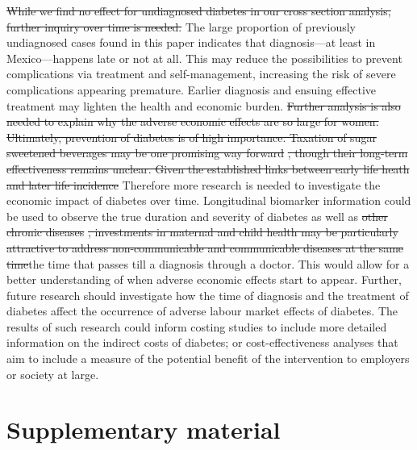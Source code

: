 \documentclass[12pt,english]{article}
\providecommand{\DIFaddtex}[1]{{\protect\color{blue}#1}} %
\providecommand{\DIFdeltex}[1]{{\protect\color{red}\sout{#1}}}                      %
\providecommand{\DIFaddbegin}{} %
\providecommand{\DIFaddend}{} %
\providecommand{\DIFdelbegin}{} %
\providecommand{\DIFdelend}{} %
\providecommand{\DIFadd}[1]{\texorpdfstring{\DIFaddtex{#1}}{#1}} %
\providecommand{\DIFdel}[1]{\texorpdfstring{\DIFdeltex{#1}}{}} %
\begin{document}
\DIFdelbegin \DIFdel{While we find no effect for undiagnosed diabetes in our cross section analysis, further inquiry over time is needed. }\DIFdelend The large proportion of previously undiagnosed cases \DIFaddbegin \DIFadd{found in this paper }\DIFaddend indicates that diagnosis—at least in Mexico—happens late or not at all. This may reduce the possibilities to prevent complications via treatment and self-management, increasing the risk of severe complications appearing premature. Earlier diagnosis and ensuing effective treatment may lighten the health and economic burden. \DIFdelbegin \DIFdel{Further analysis is also needed to explain why the adverse economic effects are so large for women. Ultimately, prevention of diabetes is of high importance. Taxation of sugar sweetened beverages may be one promising way forward }%
\DIFdel{, though their long-term effectiveness remains unclear. Given the established links between early life heath and later life incidence }\DIFdelend \DIFaddbegin \DIFadd{Therefore more research is needed to investigate the economic impact of diabetes over time. Longitudinal biomarker information could be used to observe the true duration and severity }\DIFaddend of diabetes as well as \DIFdelbegin \DIFdel{other chronic diseases }%
\DIFdel{, investments in maternal and child health may be particularly attractive to address non-communicable and communicable diseases at the same time}\DIFdelend \DIFaddbegin \DIFadd{the time that passes till a diagnosis through a doctor. This would allow for a better understanding of when adverse economic effects start to appear. Further, future research should investigate how the time of diagnosis and the treatment of diabetes affect the occurrence of adverse labour market effects of diabetes. The results of such research could inform costing studies to include more detailed information on the indirect costs of diabetes; or cost-effectiveness analyses that aim to include a measure of the potential benefit of the intervention to employers or society at large}\DIFaddend . 


	
\DIFdelbegin %

\DIFdelend \clearpage
\setcounter{table}{0}
\renewcommand{\thetable}{S\arabic{table}}
\setcounter{figure}{0}
\setcounter{page}{1}
\renewcommand{\thefigure}{S\arabic{figure}} %
\section*{Supplementary material}
\end{document}
